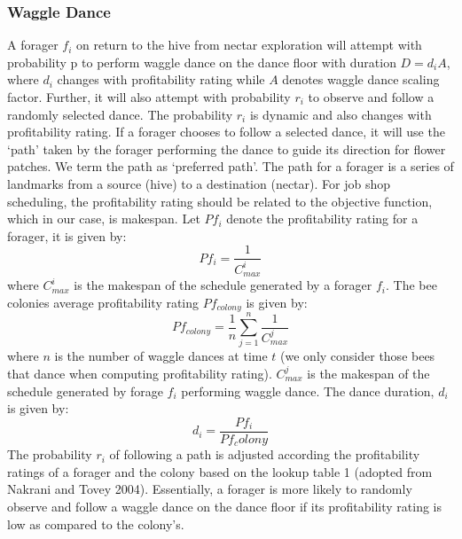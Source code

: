 \documentclass[pdftex,11pt]{article}
\begin{document}
\subsubsection{Waggle Dance}
A forager $f_i$ on return to the hive from nectar exploration will attempt with probability p to perform waggle dance on the dance floor with duration $D = d_iA$, where $d_i$ changes with profitability rating while $A$ denotes waggle dance scaling factor. Further, it will also attempt with probability $r_i$ to observe and follow a randomly selected dance. The probability $r_i$ is dynamic and also changes with profitability rating. If a forager chooses to follow a selected dance, it will use the ‘path’ taken by the forager performing the dance to guide its direction for flower patches. We term the path as ‘preferred path’. The path for a forager is a series of landmarks from a source (hive) to a destination (nectar). For job shop scheduling, the profitability rating should be related to the objective function, which in our case, is makespan. Let $Pf_i$ denote the profitability rating for a forager, it is given by:
\begin{equation}
Pf_i = \frac{1}{C^i_{max}}
\end{equation}
where $C^i_{max}$ is the makespan of the schedule generated by a forager $f_i$.
The bee colonies average profitability rating $Pf_{colony}$ is given by:
\begin{equation}
	Pf_{colony} = \frac{1}{n}\sum^n_{j=1}\frac{1}{C^j_{max}}
\end{equation}
where $n$ is the number of waggle dances at time $t$ (we only consider those bees that dance when computing profitability rating). $C^j_{max}$ is the makespan of the schedule generated by forage $f_i$ performing waggle dance. The dance duration, $d_i$ is given by:
\begin{equation}
d_i = \frac{Pf_i}{Pf_colony}
\end{equation}
The probability $r_i$ of following a path is adjusted according the profitability ratings of a forager and the colony based on the lookup table 1 (adopted from Nakrani and Tovey 2004). Essentially, a forager is more likely to randomly observe and follow a waggle dance on the dance floor if its profitability rating is low as compared to the colony’s.
\end{document}
